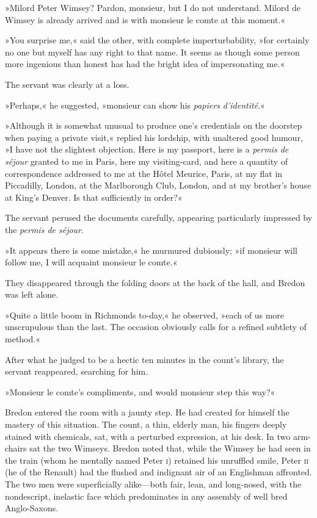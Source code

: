 »Milord Peter Wimsey? Pardon, monsieur, but I do not understand. Milord de Wimsey is already arrived and is with monsieur le comte at this moment.«

»You surprise me,« said the other, with complete imperturbability, »for certainly no one but myself has any right to that name. It seems as though some person more ingenious than honest has had the bright idea of impersonating me.«

The servant was clearly at a loss.

»Perhaps,« he suggested, »monsieur can show his \textit{papiers d'identité}.«

»Although it is somewhat unusual to produce one's credentials on the doorstep when paying a private visit,« replied his lordship, with unaltered good humour, »I have not the slightest objection. Here is my passport, here is a \textit{permis de séjour} granted to me in Paris, here my visiting-card, and here a quantity of correspondence addressed to me at the Hôtel Meurice, Paris, at my flat in Piccadilly, London, at the Marlborough Club, London, and at my brother's house at King's Denver. Is that sufficiently in order?«

The servant perused the documents carefully, appearing particularly impressed by the \textit{permis de séjour}.

»It appears there is some mistake,« he murmured dubiously; »if monsieur will follow me, I will acquaint monsieur le comte.«

They disappeared through the folding doors at the back of the hall, and Bredon was left alone.

»Quite a little boom in Richmonds to-day,« he observed, »each of us more unscrupulous than the last. The occasion obviously calls for a refined subtlety of method.«

After what he judged to be a hectic ten minutes in the count's library, the servant reappeared, searching for him.

»Monsieur le comte's compliments, and would monsieur step this way?«

Bredon entered the room with a jaunty step. He had created for himself the mastery of this situation. The count, a thin, elderly man, his fingers deeply stained with chemicals, sat, with a perturbed expression, at his desk. In two arm-chairs sat the two Wimseys. Bredon noted that, while the Wimsey he had seen in the train (whom he mentally named Peter \textsc{i}) retained his unruffled smile, Peter \textsc{ii} (he of the Renault) had the flushed and indignant air of an Englishman affronted. The two men were superficially alike—both fair, lean, and long-nosed, with the nondescript, inelastic face which predominates in any assembly of well bred Anglo-Saxons.

